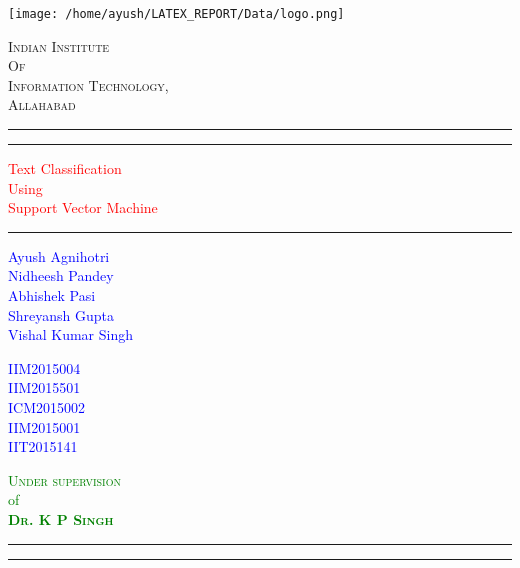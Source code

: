 \documentclass{report}
\begin{document}
 
\begin{titlepage}
	\centering
	\texttt{[image: /home/ayush/LATEX\_REPORT/Data/logo.png]}\\[.5cm]
	{\scshape\LARGE Indian Institute \\Of \\Information Technology,\\ Allahabad \par}
	\vspace{1cm}
	\rule{\textwidth}{1pt}	
	\vspace{2pt}\vspace{-\baselineskip}
	\rule{\textwidth}{0.4pt}
	\vspace{0.1\textheight}
		
	\textcolor{Red}{ 
		{\Huge Text Classification}\\[0.5\baselineskip]
		{\Large Using}\\[0.5\baselineskip]
		{\Huge Support Vector Machine}
	}
	
	\vspace{0.055\textheight} 
	
	\rule{0.3\textwidth}{0.4pt} 
	\begin{multicols}{3} 
	\textcolor{Blue}{
		\begin{flushleft} 
		{\large Ayush Agnihotri}\\[5pt] 
		{\large Nidheesh Pandey}\\[5pt]
		{\large Abhishek Pasi}\\[5pt]
		{\large Shreyansh Gupta}\\[5pt]
		{\large Vishal Kumar Singh}\\[5pt]
		\end{flushleft}
		}
		\columnbreak
		 
	\textcolor{Blue}{
		\begin{flushleft} 
		{\large IIM2015004}\\[5pt] 
		{\large IIM2015501}\\[5pt]
		{\large ICM2015002}\\[5pt]
		{\large IIM2015001}\\[5pt]
		{\large IIT2015141}\\[5pt]
		\end{flushleft}
		}
		\columnbreak

	\textcolor{Green}{
		\begin{flushright}
		{\Large \textsc{Under supervision}}\\
		{\large of}\\
		{\Large \textsc{\textbf{Dr. K P Singh}}}
		\end{flushright}
		}
	\end{multicols}
	
\hfill
		
	\rule{\textwidth}{0.4pt} %
	
	\vspace{2pt}\vspace{-\baselineskip} %
	
	\rule{\textwidth}{2pt} %
	
\end{titlepage}
\end{document}
